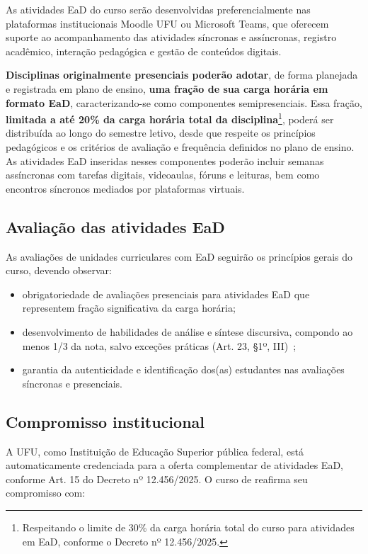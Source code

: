 As atividades EaD do curso serão desenvolvidas preferencialmente nas plataformas institucionais Moodle UFU ou Microsoft Teams, que oferecem suporte ao acompanhamento das atividades síncronas e assíncronas, registro acadêmico, interação pedagógica e gestão de conteúdos digitais.

\textbf{Disciplinas originalmente presenciais poderão adotar}, de forma planejada e registrada em plano de ensino, \textbf{uma fração de sua carga horária em formato EaD}, caracterizando-se como componentes semipresenciais. Essa fração, \textbf{limitada a até 20\% da carga horária total da disciplina}\footnote{Respeitando o limite de 30\% da carga horária total do curso para atividades em EaD, conforme o Decreto nº 12.456/2025.}, poderá ser distribuída ao longo do semestre letivo, desde que respeite os princípios pedagógicos e os critérios de avaliação e frequência definidos no plano de ensino. As atividades EaD inseridas nesses componentes poderão incluir semanas assíncronas com tarefas digitais, videoaulas, fóruns e leituras, bem como encontros síncronos mediados por plataformas virtuais.

\subsection{Avaliação das atividades EaD}

As avaliações de unidades curriculares com EaD seguirão os princípios gerais do curso, devendo observar:

\begin{itemize}
    \item obrigatoriedade de avaliações presenciais para atividades EaD que representem fração significativa da carga horária;
    \item desenvolvimento de habilidades de análise e síntese discursiva, compondo ao menos 1/3 da nota, salvo exceções práticas (Art. 23, §1º, III)~\cite{Decreto:12456:2025};
    \item garantia da autenticidade e identificação dos(as) estudantes nas avaliações síncronas e presenciais.
\end{itemize}

\subsection{Compromisso institucional}

A UFU, como Instituição de Educação Superior pública federal, está automaticamente credenciada para a oferta complementar de atividades EaD, conforme Art. 15 do Decreto nº 12.456/2025. O curso de \ppccurso reafirma seu compromisso com:

